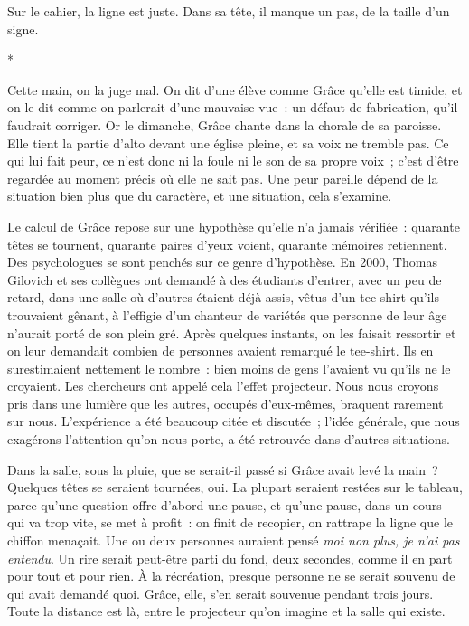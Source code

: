 \documentclass[10.5pt,twoside,openright]{book}
\newcommand{\asterisme}{\par\vspace{0.7em}\centerline{\color{gris}*\quad*\quad*}\vspace{0.7em}\par\noindent}
\begin{document}
Sur le cahier, la ligne est juste. Dans sa tête, il manque un pas, de la taille d’un signe.

\asterisme

Cette main, on la juge mal. On dit d’une élève comme Grâce qu’elle est timide, et on le dit comme on parlerait d’une mauvaise vue : un défaut de fabrication, qu’il faudrait corriger. Or le dimanche, Grâce chante dans la chorale de sa paroisse. Elle tient la partie d’alto devant une église pleine, et sa voix ne tremble pas. Ce qui lui fait peur, ce n’est donc ni la foule ni le son de sa propre voix ; c’est d’être regardée au moment précis où elle ne sait pas. Une peur pareille dépend de la situation bien plus que du caractère, et une situation, cela s’examine.

Le calcul de Grâce repose sur une hypothèse qu’elle n’a jamais vérifiée : quarante têtes se tournent, quarante paires d’yeux voient, quarante mémoires retiennent. Des psychologues se sont penchés sur ce genre d’hypothèse. En 2000, Thomas Gilovich et ses collègues ont demandé à des étudiants d’entrer, avec un peu de retard, dans une salle où d’autres étaient déjà assis, vêtus d’un tee-shirt qu’ils trouvaient gênant, à l’effigie d’un chanteur de variétés que personne de leur âge n’aurait porté de son plein gré. Après quelques instants, on les faisait ressortir et on leur demandait combien de personnes avaient remarqué le tee-shirt. Ils en surestimaient nettement le nombre : bien moins de gens l’avaient vu qu’ils ne le croyaient. Les chercheurs ont appelé cela l’effet projecteur. Nous nous croyons pris dans une lumière que les autres, occupés d’eux-mêmes, braquent rarement sur nous. L’expérience a été beaucoup citée et discutée ; l’idée générale, que nous exagérons l’attention qu’on nous porte, a été retrouvée dans d’autres situations.

Dans la salle, sous la pluie, que se serait-il passé si Grâce avait levé la main ? Quelques têtes se seraient tournées, oui. La plupart seraient restées sur le tableau, parce qu’une question offre d’abord une pause, et qu’une pause, dans un cours qui va trop vite, se met à profit : on finit de recopier, on rattrape la ligne que le chiffon menaçait. Une ou deux personnes auraient pensé \emph{moi non plus, je n’ai pas entendu}. Un rire serait peut-être parti du fond, deux secondes, comme il en part pour tout et pour rien. À la récréation, presque personne ne se serait souvenu de qui avait demandé quoi. Grâce, elle, s’en serait souvenue pendant trois jours. Toute la distance est là, entre le projecteur qu’on imagine et la salle qui existe.
\end{document}
